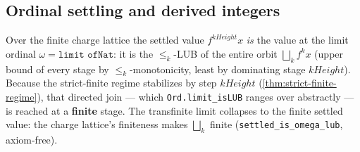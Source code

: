 \subsection{Ordinal settling and derived integers}

\begin{theorem}\label{thm:omega-limit-is-finite-settled}\leanok{}
Over the finite charge lattice the settled value $f^{kHeight}x$ \emph{is} the value at the limit
ordinal $\omega = \texttt{limit ofNat}$: it is the $\le_k$-LUB of the entire orbit
$\bigsqcup_k f^k x$ (upper bound of every stage by $\le_k$-monotonicity, least by dominating stage
$kHeight$). Because the strict-finite regime stabilizes by step $kHeight$
(\cref{thm:strict-finite-regime}), that directed join --- which \texttt{Ord.limit\_isLUB} ranges
over abstractly --- is reached at a \textbf{finite} stage. The transfinite limit collapses to the
finite settled value: the charge lattice's finiteness makes $\bigsqcup_k$ finite
(\texttt{settled\_is\_omega\_lub}, axiom-free).
\end{theorem}

